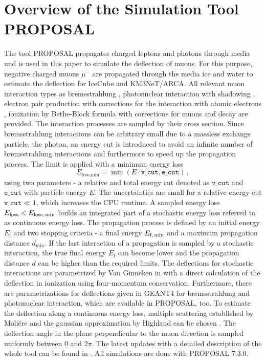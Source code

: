 \section{Overview of the Simulation Tool PROPOSAL}\label{sec:proposal}
The tool PROPOSAL propagates charged leptons and photons through media und is 
used in this paper to simulate the deflection of muons. For this purpose, 
negative charged muons $\mu^-$ are propagated through the media ice and water 
to estimate the deflection for IceCube and KM3NeT/ARCA. All relevant muon interaction types 
as bremsstrahlung \cite{KKP_1995, Karnaukhov_1999}, photonuclear interaction \cite{Abramowicz_1997} with 
shadowing \cite{ButkevichMikheyev_2002}, electron pair production \cite{KKP_proc} with corrections for the 
interaction with atomic electrons \cite{Kelner_1998}, 
ionization by Bethe-Block formula with corrections for muons \cite{Rossi} and decay are provided. The interaction processes are sampled by their cross section. Since bremsstrahlung interactions can be 
arbitrary small due to a massless exchange particle, the photon, an energy cut is introduced to avoid an infinite number of bremsstrahlung interactions 
and furthermore to speed up the propagation process. 
The limit is applied with a minimum energy loss
\begin{equation}
    E_{\text{loss,min}} = \min{(E \cdot \texttt{v\_cut}, \texttt{e\_cut})}\,,
\end{equation}
using two parameters - a relative and total energy cut denoted as 
$\texttt{v\_cut}$ and $\texttt{e\_cut}$ with particle energy $E$. The uncertainties are small 
for a relative energy cut $\texttt{v\_cut}\ll 1$, which increases the 
CPU runtime.
A sampled energy loss 
$E_{\text{loss}} < E_{\text{loss,\,min}}$ builds an integrated part of a 
stochastic energy loss referred to as continuous energy loss. The 
propagation process is defined by an initial energy $E_{\text{i}}$ and 
two stopping criteria - a final energy $E_{\text{f,\,min}}$ and a 
maximum propagation distance $d_{\text{min}}$. If the last interaction of 
a propagation is sampled by a stochastic interaction, the true final energy 
$E_{\text{f}}$ can become lower and the 
propagation distance $d$ can be higher than the required limits. 
The deflections for stochastic interactions are parametrized by Van Ginneken 
in \cite{Van_Ginneken} with a direct calculation of the deflection in 
ionization using four-momentum conservation. 
Furthermore, there are parametrizations for deflections given in GEANT4 \cite{GEANT4} 
for bremsstrahlung and photonuclear interaction, which 
are available in PROPOSAL, too.
To estimate the deflection along 
a continuous energy loss, multiple scattering established by Moliére 
\cite{moliere_scattering} and the gaussian approximation by Highland 
can be chosen \cite{HIGHLAND_1975}. 
The deflection angle in the plane perpendicular to the muon direction is 
sampled uniformly between $0$ and $2\pi$.
The latest updates with a detailed description of the whole tool can be found 
in \cite{phd_soedingrekso}.
All simulations are done with PROPOSAL $7.3.0$.

